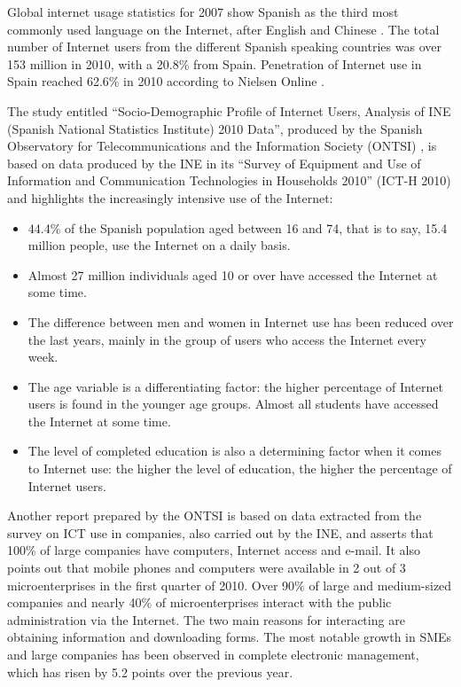 \begin{multicols}{2}

Global internet usage statistics for 2007 show Spanish as the third most commonly used language on the Internet, after English and Chinese \cite{internetworldstats}. The total number of Internet users from the different Spanish speaking countries was over 153 million in 2010, with a 20.8\% from Spain. Penetration of Internet use in Spain reached 62.6\% in 2010 according to Nielsen Online \cite{nielsen}.

The study entitled “Socio-Demographic Profile of Internet Users, Analysis of INE (Spanish National Statistics Institute) 2010 Data”, produced by the Spanish Observatory for Telecommunications and the Information Society (ONTSI) \cite{ontsi}, is based on data produced by the INE in its “Survey of Equipment and Use of Information and Communication Technologies in Households 2010” (ICT-H 2010) and highlights the increasingly intensive use of the Internet:

\begin{itemize}
  \item 44.4\% of the Spanish population aged between 16 and 74, that is to say, 15.4 million people, use the Internet on a daily basis.
  \item Almost 27 million individuals aged 10 or over have accessed the Internet at some time.
  \item The difference between men and women in Internet use has been reduced over the last years, mainly in the group of users who access the Internet every week.
  \item The age variable is a differentiating factor: the higher percentage of Internet users is found in the younger age groups. Almost all students have accessed the Internet at some time.
  \item The level of completed education is also a determining factor when it comes to Internet use: the higher the level of education, the higher the percentage of Internet users.
\end{itemize}

Another report prepared by the ONTSI is based on data extracted from the survey on ICT use in companies, also carried out by the INE, and asserts that 100\% of large companies have computers, Internet access and e-mail. It also points out that mobile phones and computers were available in 2 out of 3 microenterprises in the first quarter of 2010. Over 90\% of large and medium-sized companies and nearly 40\% of microenterprises interact with the public administration via the Internet. The two main reasons for interacting are obtaining information and downloading forms. The most notable growth in SMEs and large companies has been observed in complete electronic management, which has risen by 5.2 points over the previous year.


\end{multicols}
